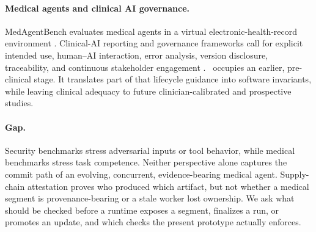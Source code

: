 \paragraph{Medical agents and clinical AI governance.}
MedAgentBench evaluates medical agents in a virtual electronic-health-record
environment \citep{jiang2025medagentbench}.  Clinical-AI reporting and
governance frameworks call for explicit intended use, human--AI interaction,
error analysis, version disclosure, traceability, and continuous stakeholder
engagement \citep{vasey2022decide,liu2020consortai,lekadir2025futureai}.
\system\ occupies an earlier, pre-clinical stage.  It translates part of that
lifecycle guidance into software invariants, while leaving clinical adequacy
to future clinician-calibrated and prospective studies.

\paragraph{Gap.}
Security benchmarks stress adversarial inputs or tool behavior, while medical
benchmarks stress task competence.  Neither perspective alone captures the
commit path of an evolving, concurrent, evidence-bearing medical agent.
Supply-chain attestation proves who produced which artifact, but not whether
a medical segment is provenance-bearing or a stale worker lost ownership.
We ask what should be checked before a runtime exposes a segment, finalizes a
run, or promotes an update, and which checks the present prototype actually
enforces.
